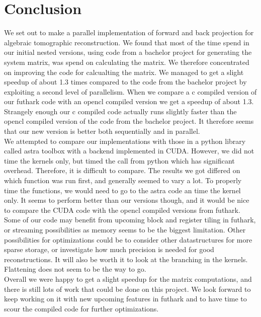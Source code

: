 \section{Conclusion}
We set out to make a parallel implementation of forward and back projection for algebraic tomographic reconstruction. We found that most of the time spend in our initial nested versions, using code from a bachelor project for generating the system matrix, was spend on calculating the matrix. We therefore concentrated on improving the code for calcualting the matrix. We managed to get a slight speedup of about 1.3 times compared to the code from the bachelor project by exploiting a second level of parallelism. When we compare a c compiled version of our futhark code with an opencl compiled version we get a speedup of about 1.3. Strangely enough our c compiled code actually runs slightly faster than the opencl compiled version of the code from the bachelor project. It therefore seems that our new version is better both sequentially and in parallel.\\
We attempted to compare our implementations with those in a python library called astra toolbox with a backend implemented in CUDA. However, we did not time the kernels only, but timed the call from python which has significant overhead. Therefore, it is difficult to compare. The results we got differed on which function was run first, and generally seemed to vary a lot. To properly time the functions, we would need to go to the astra code an time the kernel only. It seems to perform better than our versions though, and it would be nice to compare the CUDA code with the opencl compiled versions from futhark.\\
Some of our code may benefit from upcoming block and register tiling in futhark, or streaming possibilities as memory seems to be the biggest limitation. Other possibilities for optimizations could be to consider other datastructures for more sparse storage, or investigate how much precision is needed for good reconstructions. It will also be worth it to look at the branching in the kernels. Flattening does not seem to be the way to go.\\
Overall we were happy to get a slight speedup for the matrix computations, and there is still lots of work that could be done on this project. We look forward to keep working on it with new upcoming features in futhark and to have time to scour the compiled code for further optimizations.
